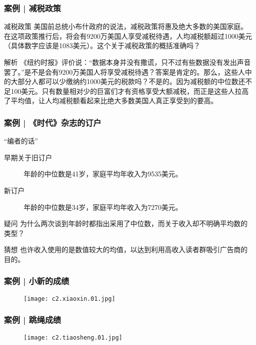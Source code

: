 \begin{frame}
  \frametitle{案例 | 减税政策}
  \begin{block}{减税政策}
    美国前总统小布什政府的说法，减税政策将惠及绝大多数的美国家庭。在这项政策推行后，将会有9200万美国人享受减税待遇，人均减税额超过1000美元（具体数字应该是1083美元）。这个关于减税政策的概括准确吗？
  \end{block}
  \pause
  \begin{block}{解析}
    《纽约时报》评价说：“数据本身并没有撒谎，只不过有些数据没有发出声音罢了。”是不是会有9200万美国人将享受减税待遇？答案是肯定的。那么，这些人中的大部分人都可以少缴纳约1000美元的税款吗？不是的。因为减税额的中位数还不足100美元。只有数量相对少的巨富们才有资格享受大额减税，而正是这些人拉高了平均值，让人均减税额看起来比绝大多数美国人真正享受到的要高。
  \end{block}
\end{frame}

\begin{frame}
  \frametitle{案例 | 《时代》杂志的订户}
  \begin{block}{“编者的话”}
    \begin{description}
      \item[早期关于旧订户] 年龄的中位数是41岁，家庭平均年收入为9535美元。
      \item[新订户] 年龄的中位数是34岁，家庭平均年收入为7270美元。
    \end{description}
  \end{block}
  \pause
  \begin{block}{疑问}
    为什么两次谈到年龄时都指出采用了中位数，而关于收入却不明确平均数的类型？
  \end{block}
  \pause
  \begin{block}{猜想}
    也许收入使用的是数值较大的均值，以达到利用高收入读者群吸引广告商的目的。
  \end{block}
\end{frame}

\begin{frame}
  \frametitle{案例 | 小新的成绩}
  \begin{figure}
    \centering
    \texttt{[image: c2.xiaoxin.01.jpg]}
  \end{figure}
\end{frame}

\begin{frame}
  \frametitle{案例 | 跳绳成绩}
  \begin{figure}
    \centering
    \texttt{[image: c2.tiaosheng.01.jpg]}
  \end{figure}
\end{frame}

